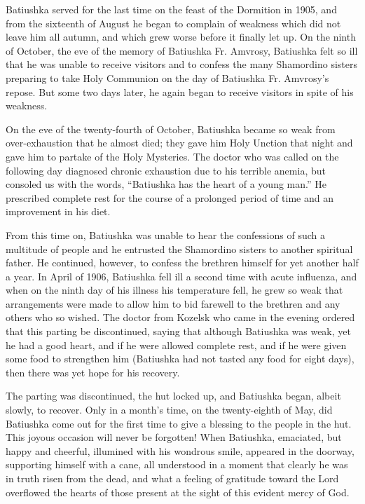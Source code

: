 Batiushka served for the last time on the feast of the Dormition in 1905, and from the sixteenth of August he began to complain of weakness which did not leave him all autumn, and which grew worse before it finally let up. On the ninth of October, the eve of the memory of Batiushka Fr. Amvrosy, Batiushka felt so ill that he was unable to receive visitors and to confess the many Shamordino sisters preparing to take Holy Communion on the day of Batiushka Fr. Amvrosy's repose. But some two days later, he again began to receive visitors in spite of his weakness.

On the eve of the twenty-fourth of October, Batiushka became so weak from over-exhaustion that he almost died; they gave him Holy Unction that night and gave him to partake of the Holy Mysteries. The doctor who was called on the following day diagnosed chronic exhaustion due to his terrible anemia, but consoled us with the words, ``Batiushka has the heart of a young man.'' He prescribed complete rest for the course of a prolonged period of time and an improvement in his diet.

From this time on, Batiushka was unable to hear the confessions of such a multitude of people and he entrusted the Shamordino sisters to another spiritual father. He continued, however, to confess the brethren himself for yet another half a year. In April of 1906, Batiushka fell ill a second time with acute influenza, and when on the ninth day of his illness his temperature fell, he grew so weak that arrangements were made to allow him to bid farewell to the brethren and any others who so wished. The doctor from Kozelsk who came in the evening ordered that this parting be discontinued, saying that although Batiushka was weak, yet he had a good heart, and if he were allowed complete rest, and if he were given some food to strengthen him (Batiushka had not tasted any food for eight days), then there was yet hope for his recovery.

The parting was discontinued, the hut locked up, and Batiushka began, albeit slowly, to recover. Only in a month's time, on the twenty-eighth of May, did Batiushka come out for the first time to give a blessing to the people in the hut. This joyous occasion will never be forgotten! When Batiushka, emaciated, but happy and cheerful, illumined with his wondrous smile, appeared in the doorway, supporting himself with a cane, all understood in a moment that clearly he was in truth risen from the dead, and what a feeling of gratitude toward the Lord overflowed the hearts of those present at the sight of this evident mercy of God.

